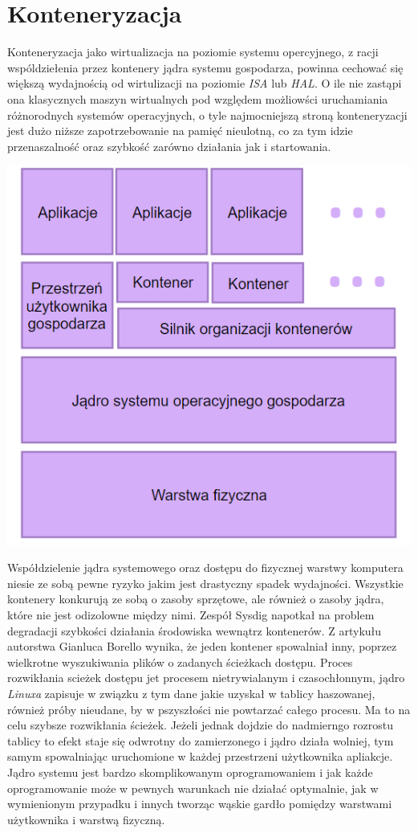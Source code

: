 \documentclass[polish, a4paper, 12pt, oneside]{book}
\begin{document}
\section{Konteneryzacja}
Konteneryzacja jako wirtualizacja na poziomie systemu opercyjnego, z racji wspóldziełenia przez kontenery jądra systemu gospodarza, powinna cechować się większą wydajnością od wirtulizacji na poziomie \textit{ISA} lub \textit{HAL}. O ile nie zastąpi ona klasycznych maszyn wirtualnych pod względem możliowści uruchamiania różnorodnych systemów operacyjnych, o tyle najmocniejszą stroną konteneryzacji jest dużo niższe zapotrzebowanie na pamięć nieulotną, co za tym idzie przenaszalność oraz szybkość zarówno działania jak i startowania. 
\begin{center}
\includegraphics[width=140mm]{schemat_kont.png}
\end{center}
Współdzielenie jądra systemowego oraz dostępu do fizycznej warstwy komputera niesie ze sobą pewne ryzyko jakim jest drastyczny spadek wydajności. Wszystkie kontenery konkurują ze sobą o zasoby sprzętowe, ale również o zasoby jądra, które nie jest odizolowne między nimi. Zespół Sysdig napotkał na problem degradacji szybkości działania środowiska wewnątrz kontenerów. Z artykułu autorstwa Gianluca Borello\cite{sd17} wynika, że jeden kontener spowalniał inny, poprzez wielkrotne wyszukiwania plików o zadanych ścieżkach dostępu. Proces rozwikłania scieżek dostępu jet procesem nietrywialanym i czasochłonnym, jądro \textit{Linuxa} zapisuje w związku z tym dane jakie uzyskał w tablicy haszowanej, również próby nieudane, by w pszyszłości nie powtarzać całego procesu. Ma to na celu szybsze rozwikłania ścieżek. Jeżeli jednak dojdzie do nadmierngo rozrostu tablicy to efekt staje się odwrotny do zamierzonego i jądro działa wolniej, tym samym spowalniając uruchomione w każdej przestrzeni użytkownika apliakcje. Jądro systemu jest bardzo skomplikowanym oprogramowaniem i jak każde oprogramowanie może w pewnych warunkach nie działać optymalnie, jak w wymienionym przypadku i innych tworząc wąskie gardło pomiędzy warstwami użytkownika i warstwą fizyczną.
\end{document}
